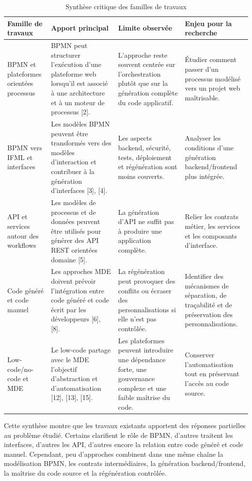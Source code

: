 \begin{table}[H]
\caption{Synthèse critique des familles de travaux}
\label{tab:synthese-critique-familles-travaux}
\centering
\footnotesize
\renewcommand{\arraystretch}{1.2}
\begin{tabular}{|p{2.8cm}|p{3.4cm}|p{3.5cm}|p{3.5cm}|}
\hline
\textbf{Famille de travaux} & \textbf{Apport principal} & \textbf{Limite observée} & \textbf{Enjeu pour la recherche} \\
\hline
BPMN et plateformes orientées processus & BPMN peut structurer l'exécution d'une plateforme web lorsqu'il est associé à une architecture et à un moteur de processus [2]. & L'approche reste souvent centrée sur l'orchestration plutôt que sur la génération complète du code applicatif. & Étudier comment passer d'un processus modélisé vers un projet web maîtrisable. \\
\hline
BPMN vers IFML et interfaces & Les modèles BPMN peuvent être transformés vers des modèles d'interaction et contribuer à la génération d'interfaces [3], [4]. & Les aspects backend, sécurité, tests, déploiement et régénération sont moins couverts. & Analyser les conditions d'une génération backend/frontend plus intégrée. \\
\hline
API et services autour des workflows & Les modèles de processus et de données peuvent être utilisés pour générer des API REST orientées domaine [5]. & La génération d'API ne suffit pas à produire une application complète. & Relier les contrats métier, les services et les composants d'interface. \\
\hline
Code généré et code manuel & Les approches MDE doivent prévoir l'intégration entre code généré et code écrit par les développeurs [6], [8]. & La régénération peut provoquer des conflits ou écraser des personnalisations si elle n'est pas contrôlée. & Identifier des mécanismes de séparation, de traçabilité et de préservation des personnalisations. \\
\hline
Low-code/no-code et MDE & Le low-code partage avec le MDE l'objectif d'abstraction et d'automatisation [12], [13], [15]. & Les plateformes peuvent introduire une dépendance forte, une gouvernance complexe et une faible maîtrise du code. & Conserver l'automatisation tout en préservant l'accès au code source. \\
\hline
\end{tabular}
\end{table}

Cette synthèse montre que les travaux existants apportent des réponses partielles au problème étudié. Certains clarifient le rôle de BPMN, d'autres traitent les interfaces, d'autres les API, d'autres encore la relation entre code généré et code manuel. Cependant, peu d'approches combinent dans une même chaîne la modélisation BPMN, les contrats intermédiaires, la génération backend/frontend, la maîtrise du code source et la régénération contrôlée.

